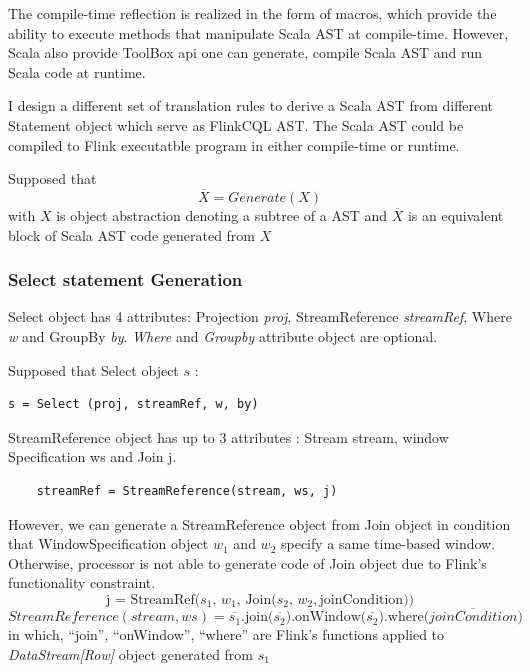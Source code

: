 The compile-time reflection is realized in the form of macros, which provide the ability to execute methods that manipulate Scala AST at compile-time. However, Scala also provide ToolBox api one can generate, compile Scala AST and run Scala code at runtime. 

I design a different set of translation rules to derive a Scala AST from different Statement object which serve as FlinkCQL AST. The Scala AST could be compiled to Flink executatble program in either compile-time or runtime.

Supposed that 
\begin{equation}
	\overline{X} = Generate(X)
\end{equation}
 with $X$ is object abstraction denoting a subtree of a AST and $\overline{X}$ is an equivalent block of Scala AST code generated from $X$

\subsubsection*{Select statement Generation}
Select object has 4 attributes: Projection \textit{proj}, StreamReference \textit{streamRef}, Where \textit{w} and GroupBy \textit{by}. \textit{Where} and \textit{Groupby} attribute object are optional. 

Supposed that Select object $s$ :
\begin{lstlisting}
s = Select (proj, streamRef, w, by)
\end{lstlisting}

StreamReference object has up to 3 attributes :  Stream stream, window Specification ws and Join j.
\begin{lstlisting}
	streamRef = StreamReference(stream, ws, j)
\end{lstlisting}

However, we can generate a StreamReference object from Join object in condition that WindowSpecification object $w_1$ and $w_2$ specify a same time-based window. Otherwise, processor is not able to generate code of Join object due to Flink's functionality constraint.
\begin{equation}
	\textrm{j = StreamRef(}s_1,\, w_1,\, \textrm{Join(}s_2,\, w_2, \textrm{joinCondition))}
\end{equation}
\begin{equation}
StreamReference(stream, ws) = \overline{  s_1}\textrm{.join(}\overline{s_2})\textrm{.onWindow(}\overline{s_2}\textrm{).where(}\overline{joinCondition}\textrm{)}
\end{equation}
in which, ``join'', ``onWindow'', ``where'' are Flink's functions applied to  \textit{DataStream[Row]} object generated from $s_1$

